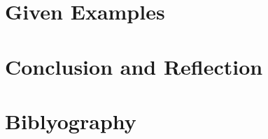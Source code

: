 \documentclass[11pt]{article}
\numberwithin{equation}{subsection}
\begin{document}
\section{Given Examples}

\section{Conclusion and Reflection}
\newpage

\section*{Biblyography}
\end{document}
